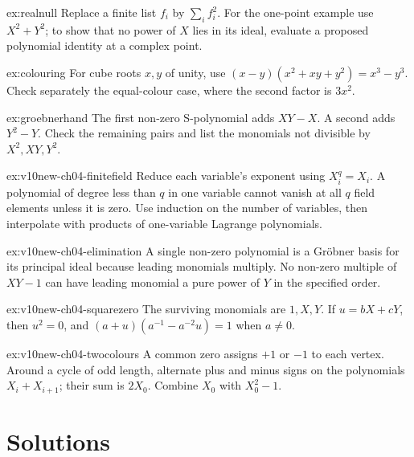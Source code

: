 \begin{hint}{ex:realnull}
Replace a finite list $f_i$ by $\sum_i f_i^2$. For the one-point example use $X^2+Y^2$; to show that no power of $X$ lies in its ideal, evaluate a proposed polynomial identity at a complex point.
\end{hint}

\begin{hint}{ex:colouring}
For cube roots $x,y$ of unity, use $(x-y)(x^2+xy+y^2)=x^3-y^3$. Check separately the equal-colour case, where the second factor is $3x^2$.
\end{hint}

\begin{hint}{ex:groebnerhand}
The first non-zero S-polynomial adds $XY-X$. A second adds $Y^2-Y$. Check the remaining pairs and list the monomials not divisible by $X^2,XY,Y^2$.
\end{hint}

\begin{hint}{ex:v10new-ch04-finitefield}
Reduce each variable's exponent using $X_i^q=X_i$. A polynomial of degree less than $q$ in one variable cannot vanish at all $q$ field elements unless it is zero. Use induction on the number of variables, then interpolate with products of one-variable Lagrange polynomials.
\end{hint}

\begin{hint}{ex:v10new-ch04-elimination}
A single non-zero polynomial is a Gröbner basis for its principal ideal because leading monomials multiply. No non-zero multiple of $XY-1$ can have leading monomial a pure power of $Y$ in the specified order.
\end{hint}

\begin{hint}{ex:v10new-ch04-squarezero}
The surviving monomials are $1,X,Y$. If $u=bX+cY$, then $u^2=0$, and $(a+u)(a^{-1}-a^{-2}u)=1$ when $a\ne0$.
\end{hint}

\begin{hint}{ex:v10new-ch04-twocolours}
A common zero assigns $+1$ or $-1$ to each vertex. Around a cycle of odd length, alternate plus and minus signs on the polynomials $X_i+X_{i+1}$; their sum is $2X_0$. Combine $X_0$ with $X_0^2-1$.
\end{hint}

\section{Solutions}

